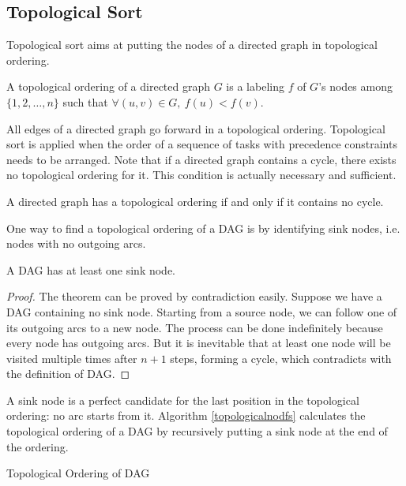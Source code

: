 \subsection{Topological Sort}
Topological sort aims at putting the nodes of a directed graph in topological ordering. 
\begin{definition}
A topological ordering of a directed graph $G$ is a labeling $f$ of $G$'s nodes among $\{1,2,\dots,n\}$ such that $\forall(u,v)\in G,\:f(u)<f(v)$.
\end{definition}
All edges of a directed graph go forward in a topological ordering. Topological sort is applied when the order of a sequence of tasks with precedence constraints needs to be arranged. Note that if a directed graph contains a cycle, there exists no topological ordering for it. This condition is actually necessary and sufficient.
\begin{theorem}
A directed graph has a topological ordering if and only if it contains no cycle.
\end{theorem}
One way to find a topological ordering of a DAG is by identifying sink nodes, i.e. nodes with no outgoing arcs.
\begin{theorem}
A DAG has at least one sink node.
\end{theorem}
\begin{proof}
The theorem can be proved by contradiction easily. Suppose we have a DAG containing no sink node. Starting from a source node, we can follow one of its outgoing arcs to a new node. The process can be done indefinitely because every node has outgoing arcs. But it is inevitable that at least one node will be visited multiple times after $n+1$ steps, forming a cycle, which contradicts with the definition of DAG.
\end{proof}
A sink node is a perfect candidate for the last position in the topological ordering: no arc starts from it. Algorithm \ref{topologicalnodfs} calculates the topological ordering of a DAG by recursively putting a sink node at the end of the ordering. 
\begin{algorithm}[ht]
\caption{Topological Ordering of DAG}\label{topologicalnodfs}
\begin{algorithmic}[1]
\Input{}
\Output{}
\EndIf
{}
\EndFunction
\end{algorithmic}
\end{algorithm}

